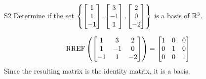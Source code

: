 \begin{problem}{S2}
Determine if the set \(\left\{\begin{bmatrix} 1 \\ 1 \\ -1 \end{bmatrix}, \begin{bmatrix} 3 \\ -1 \\ 1 \end{bmatrix},\begin{bmatrix} 2 \\ 0 \\ -2 \end{bmatrix}\right\}\) is a basis of \(\mathbb{R}^3\).
\end{problem}
\begin{solution}
\[\operatorname{RREF}\left(\begin{bmatrix} 1 & 3 & 2 \\ 1 & -1 & 0 \\ -1 & 1 & -2 \end{bmatrix} \right)= \begin{bmatrix} 1 & 0 &0 \\ 0 & 1 & 0 \\ 0 & 0 & 1\end{bmatrix}\]
Since the resulting matrix is the identity matrix, it is a basis.
\end{solution}





